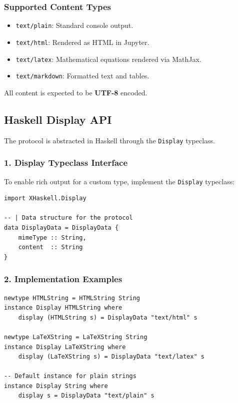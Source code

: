 \subsubsection{Supported Content Types}


\begin{itemize}
\item \texttt{text/plain}: Standard console output.
\item \texttt{text/html}: Rendered as HTML in Jupyter.
\item \texttt{text/latex}: Mathematical equations rendered via MathJax.
\item \texttt{text/markdown}: Formatted text and tables.
\end{itemize}


All content is expected to be \textbf{UTF-8} encoded.
\subsection{Haskell Display API}


The protocol is abstracted in Haskell through the \texttt{Display} typeclass.
\subsubsection{1. Display Typeclass Interface}


To enable rich output for a custom type, implement the \texttt{Display} typeclass:
\begin{verbatim}
import XHaskell.Display

-- | Data structure for the protocol
data DisplayData = DisplayData {
    mimeType :: String,
    content  :: String
}
\end{verbatim}


\subsubsection{2. Implementation Examples}


\begin{verbatim}
newtype HTMLString = HTMLString String
instance Display HTMLString where
    display (HTMLString s) = DisplayData "text/html" s

newtype LaTeXString = LaTeXString String
instance Display LaTeXString where
    display (LaTeXString s) = DisplayData "text/latex" s

-- Default instance for plain strings
instance Display String where
    display s = DisplayData "text/plain" s
\end{verbatim}


